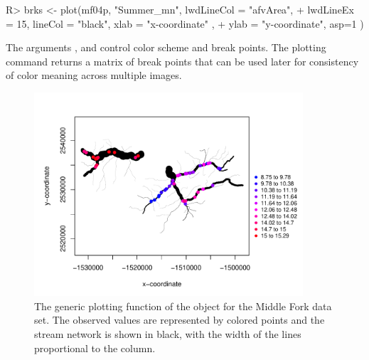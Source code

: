 \documentclass[nojss]{jss}
\renewenvironment{Schunk}{\vspace{\topsep}}{\vspace{\topsep}}
\begin{document}
\begin{Schunk}
\begin{Sinput}
R> brks <- plot(mf04p, "Summer_mn", lwdLineCol = "afvArea",
+     lwdLineEx = 15, lineCol = "black", xlab =  "x-coordinate" ,
+     ylab =  "y-coordinate", asp=1 )
\end{Sinput}
\end{Schunk}

The arguments ,  and 
control color scheme and break points. The plotting command returns a
matrix of break points that can be used later for consistency of color
meaning across multiple images.

\begin{figure}[htbp]
  \begin{center}
    \includegraphics[keepaspectratio=true, width = 100mm]{Figures/jss984Fig-plotSpatialStreamNetwork}
    \caption{The generic plotting function of the
       object for the Middle
      Fork data set. The observed values are
      represented by colored points and the stream network is shown in
      black, with the width of the lines proportional to the
       column.\label{plotSpatialStreamNetwork}}
  \end{center}
\end{figure}
\end{document}
